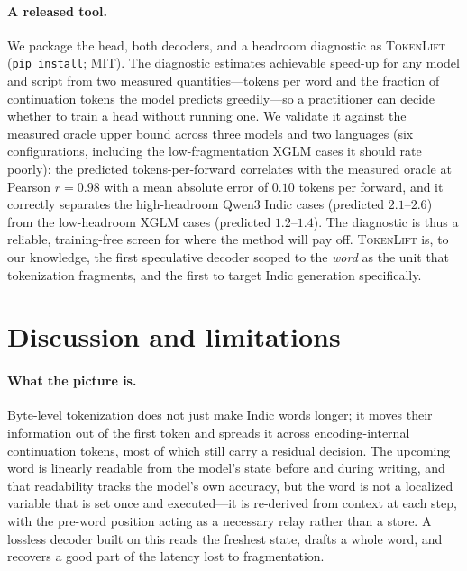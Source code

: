 \paragraph{A released tool.} We package the head, both decoders, and a headroom
diagnostic as \textsc{TokenLift} (\texttt{pip install}; MIT). The diagnostic
estimates achievable speed-up for any model and script from two measured
quantities---tokens per word and the fraction of continuation tokens the model
predicts greedily---so a practitioner can decide whether to train a head without
running one. We validate it against the measured oracle upper bound across three
models and two languages (six configurations, including the low-fragmentation
XGLM cases it should rate poorly): the predicted tokens-per-forward correlates
with the measured oracle at Pearson $r=0.98$ with a mean absolute error of
$0.10$ tokens per forward, and it correctly separates the high-headroom Qwen3
Indic cases (predicted $2.1$--$2.6$) from the low-headroom XGLM cases (predicted
$1.2$--$1.4$). The diagnostic is thus a reliable, training-free screen for where
the method will pay off. \textsc{TokenLift} is, to our knowledge, the first
speculative decoder scoped to the \emph{word} as the unit that tokenization
fragments, and the first to target Indic generation specifically.

\section{Discussion and limitations}

\paragraph{What the picture is.} Byte-level tokenization does not just make
Indic words longer; it moves their information out of the first token and
spreads it across encoding-internal continuation tokens, most of which still
carry a residual decision. The upcoming word is linearly readable from the
model's state before and during writing, and that readability tracks the
model's own accuracy, but the word is not a localized variable that is set once
and executed---it is re-derived from context at each step, with the pre-word
position acting as a necessary relay rather than a store. A lossless decoder
built on this reads the freshest state, drafts a whole word, and recovers a
good part of the latency lost to fragmentation.

